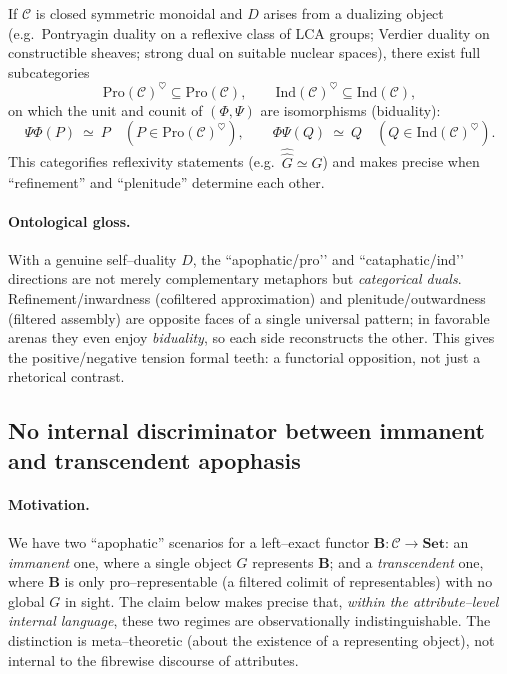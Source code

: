 \documentclass[11pt]{article}
\theoremstyle{upright}
\begin{document}
\begin{infobox}[title={Reflexive subcategories (idea)}]
If $\mathcal C$ is closed symmetric monoidal and $D$ arises from a dualizing object (e.g.\ Pontryagin duality on a reflexive class of LCA groups; Verdier duality on constructible sheaves; strong dual on suitable nuclear spaces), there exist full subcategories
\[
\mathrm{Pro}(\mathcal C)^{\heartsuit}\subseteq \mathrm{Pro}(\mathcal C),
\qquad
\mathrm{Ind}(\mathcal C)^{\heartsuit}\subseteq \mathrm{Ind}(\mathcal C),
\]
on which the unit and counit of $(\Phi,\Psi)$ are isomorphisms (biduality):
\[
\Psi\Phi(P)\ \simeq\ P\quad (P\in \mathrm{Pro}(\mathcal C)^{\heartsuit}),\qquad
\Phi\Psi(Q)\ \simeq\ Q\quad (Q\in \mathrm{Ind}(\mathcal C)^{\heartsuit}).
\]
This categorifies reflexivity statements (e.g.\ $\widehat{\widehat{G}}\simeq G$) and makes precise when “refinement” and “plenitude” determine each other.
\end{infobox}

\paragraph{Ontological gloss.}
With a genuine self–duality $D$, the “apophatic/pro’’ and “cataphatic/ind’’ directions are not merely complementary metaphors but \emph{categorical duals}. Refinement/inwardness (cofiltered approximation) and plenitude/outwardness (filtered assembly) are opposite faces of a single universal pattern; in favorable arenas they even enjoy \emph{biduality}, so each side reconstructs the other. This gives the positive/negative tension formal teeth: a functorial opposition, not just a rhetorical contrast.

\subsection{No internal discriminator between immanent and transcendent apophasis}\label{subsec:no-internal-discriminator}

\paragraph{Motivation.}
We have two “apophatic” scenarios for a left–exact functor $\mathbf B:\mathcal C\to\mathbf{Set}$: an \emph{immanent} one, where a single object $G$ represents $\mathbf B$; and a \emph{transcendent} one, where $\mathbf B$ is only pro–representable (a filtered colimit of representables) with no global $G$ in sight. The claim below makes precise that, \emph{within the attribute–level internal language}, these two regimes are observationally indistinguishable. The distinction is meta–theoretic (about the existence of a representing object), not internal to the fibrewise discourse of attributes.
\end{document}
